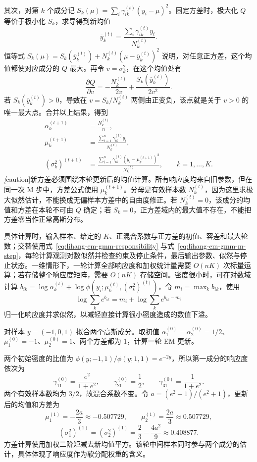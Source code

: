 其次，对第 $k$ 个成分记 $S_k(\mu)=\sum_i\gamma_{ik}^{(t)}(y_i-\mu)^2$。固定方差时，极大化 $Q$ 等价于极小化 $S_k$，求导得到新均值
\[
  \overline y_k^{(t)}=\frac{\sum_i\gamma_{ik}^{(t)}y_i}{N_k^{(t)}}.
\]
恒等式 $S_k(\mu)=S_k(\overline y_k^{(t)})+N_k^{(t)}(\mu-\overline y_k^{(t)})^2$ 说明，对任意正方差，这个均值都使对应成分的 $Q$ 最大。再令 $v=\sigma_k^2$，在这个均值处有
\[
  \frac{\partial Q}{\partial v}
  =-\frac{N_k^{(t)}}{2v}+\frac{S_k(\overline y_k^{(t)})}{2v^2}.
\]
若 $S_k(\overline y_k^{(t)})>0$，导数在 $v=S_k/N_k^{(t)}$ 两侧由正变负，该点就是关于 $v>0$ 的唯一最大点。合并以上结果，得到
\begin{equation}
  \begin{aligned}
    \alpha_k^{(t+1)}&=\frac{N_k^{(t)}}n,\\
    \mu_k^{(t+1)}&=\frac{\sum_{i=1}^n\gamma_{ik}^{(t)}y_i}{N_k^{(t)}},\\
    (\sigma_k^2)^{(t+1)}
    &=\frac{\sum_{i=1}^n\gamma_{ik}^{(t)}(y_i-\mu_k^{(t+1)})^2}{N_k^{(t)}},
    \qquad k=1,\ldots,K.
  \end{aligned}
  \label{eq:lihang-em-gmm-m-step}
\end{equation}
\emph[caution]{新方差必须围绕本轮更新后的均值计算}。所有响应度均来自旧参数，但在同一次 M 步中，方差公式使用 $\mu_k^{(t+1)}$。分母是有效样本数 $N_k^{(t)}$，因为这里求极大似然估计，不能换成无偏样本方差中的自由度修正。若 $N_k^{(t)}=0$，该成分的均值和方差在本轮不可由 $Q$ 确定；若 $S_k=0$，正方差域内的最大值不存在，不能把方差零当作正常高斯分布。

具体计算时，输入样本、给定的 $K$、正混合系数与正方差的初值、容差和最大轮数；交替使用式~\eqref{eq:lihang-em-gmm-responsibility} 与式~\eqref{eq:lihang-em-gmm-m-step}，每轮计算观测对数似然并检查约束及停止条件，最后输出参数、似然与停止状态。一维情形下，一轮计算全部响应度和加权统计量需要 $O(nK)$ 次标量运算；若存储整个响应度矩阵，需要 $O(nK)$ 存储空间。密度很小时，可在对数域计算 $b_{ik}=\log\alpha_k^{(t)}+\log\phi(y_i;\mu_k^{(t)},(\sigma_k^2)^{(t)})$，令 $m_i=\max_k b_{ik}$，使用
\[
  \log\sum_k e^{b_{ik}}=m_i+\log\sum_k e^{b_{ik}-m_i}
\]
归一化响应度并求似然，以减轻直接计算很小密度造成的数值下溢。

\begin{example}
\label{ex:lihang-em-gmm-one-step}
对样本 $y=(-1,0,1)$ 拟合两个高斯成分。取初值 $\alpha_1^{(0)}=\alpha_2^{(0)}=1/2$、$\mu_1^{(0)}=-1$、$\mu_2^{(0)}=1$、两个方差都为 $1$，计算一轮 EM 更新。
\end{example}

\begin{solve}
两个初始密度的比值为 $\phi(y;-1,1)/\phi(y;1,1)=e^{-2y}$，所以第一成分的响应度依次为
\[
  \gamma_{11}^{(0)}=\frac{e^2}{1+e^2},\qquad
  \gamma_{21}^{(0)}=\frac12,\qquad
  \gamma_{31}^{(0)}=\frac1{1+e^2}.
\]
两个有效样本数均为 $3/2$，故混合系数不变。令 $a=(e^2-1)/(e^2+1)$，更新后的均值和方差为
\[
  \mu_1^{(1)}=-\frac{2a}{3}\approx-0.507729,\qquad
  \mu_2^{(1)}=\frac{2a}{3}\approx0.507729,
\]
\[
  (\sigma_1^2)^{(1)}=(\sigma_2^2)^{(1)}
  =\frac23-\frac{4a^2}{9}\approx0.408877.
\]
方差计算使用加权二阶矩减去新均值平方。该轮中间样本同时参与两个成分的估计，具体体现了响应度作为软分配权重的含义。
\end{solve}

